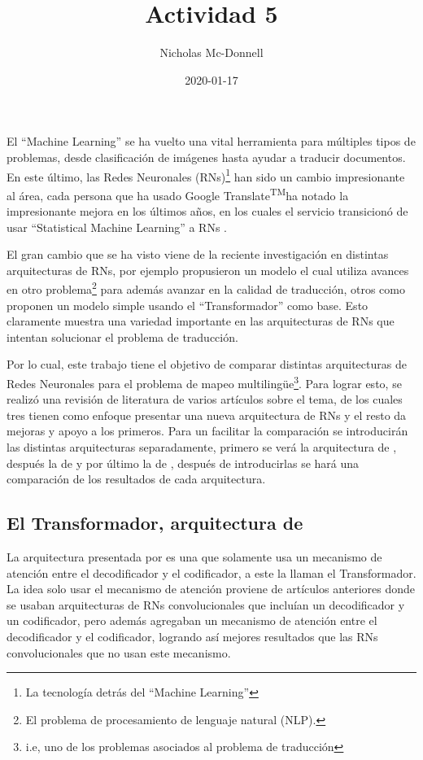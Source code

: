 \documentclass{homework}
\title{Actividad 5}
\date{2020-01-17}
\author{Nicholas Mc-Donnell}
\newcommand{\tm}{\textsuperscript{TM}}
\begin{document}
\renewcommand{\BOthers}[1]{et al.\hbox{}}
\maketitle

El ``Machine Learning'' se ha vuelto una vital herramienta para múltiples tipos de problemas, desde  clasificación de imágenes \cite{DBLP:journals/corr/abs-1905-03288} hasta ayudar a traducir documentos. En este último, las Redes Neuronales (RNs)\footnote{La tecnología detrás del ``Machine Learning''} han sido un cambio impresionante al área, cada persona que ha usado Google Translate\tm ha notado la impresionante mejora en los últimos años, en los cuales el servicio transicionó de usar ``Statistical Machine Learning'' a RNs .

El gran cambio que se ha visto viene de la reciente investigación en distintas arquitecturas de RNs, por ejemplo  propusieron un modelo el cual utiliza avances en otro problema\footnote{El problema de procesamiento de lenguaje natural (NLP).} para además avanzar en la calidad de traducción, otros como  proponen un modelo simple usando el ``Transformador'' como base. Esto claramente muestra una variedad importante en las arquitecturas de RNs que intentan solucionar el problema de traducción.

Por lo cual, este trabajo tiene el objetivo de comparar distintas arquitecturas de Redes Neuronales para el problema de mapeo multilingüe\footnote{i.e, uno de los problemas asociados al problema de traducción}. Para lograr esto, se realizó una revisión de literatura de varios artículos sobre el tema, de los cuales tres tienen como enfoque presentar una nueva arquitectura de RNs y el resto da mejoras y apoyo a los primeros. Para un facilitar la comparación se introducirán las distintas arquitecturas separadamente, primero se verá la arquitectura de , después la de  y por último la de , después de introducirlas se hará una comparación de los resultados de cada arquitectura.

\subsection*{El Transformador, arquitectura de }

La arquitectura presentada por  es una que solamente usa un mecanismo de atención entre el decodificador y el codificador, a este la llaman el Transformador. La idea solo usar el mecanismo de atención proviene de artículos anteriores donde se usaban arquitecturas de RNs convolucionales que incluían un decodificador y un codificador, pero además agregaban un mecanismo de atención entre el decodificador y el codificador, logrando así mejores resultados que las RNs convolucionales que no usan este mecanismo.
\end{document}
